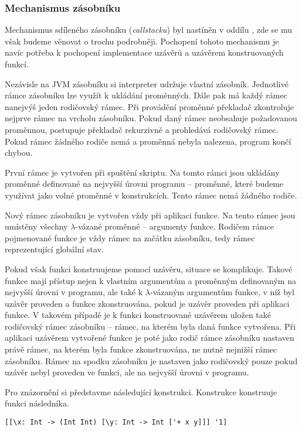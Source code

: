 \subsubsection{Mechanismus zásobníku}

Mechanismus sdíleného zásobníku (\textit{callstacku}) byl nastíněn v oddílu
, zde se mu však budeme věnovat o trochu podrobněji.
Pochopení tohoto mechanismu je navíc potřeba k pochopení implementace uzávěrů a uzávěrem
konstruovaných funkcí.

Nezávisle na JVM zásobníku si interpreter udržuje vlastní zásobník. Jednotlivé rámce zásobníku
lze využít k ukládání proměnných. Dále pak má každý rámec nanejvýš jeden rodičovský rámec.
Při provádění proměnné překladač zkontroluje nejprve rámec na vrcholu zásobníku. Pokud daný rámec
neobsahuje požadovanou proměnnou, postupuje překladač rekurzivně a prohledává rodičovský rámec.
Pokud rámec žádného rodiče nemá a proměnná nebyla nalezena, program končí chybou.

První rámec je vytvořen při spuštění skriptu. Na tomto rámci jsou ukládány proměnné definované
na nejvyšší úrovni programu -- proměnné, které budeme využívat jako volné proměnné v konstrukcích.
Tento rámec nemá žádného rodiče.

Nový rámec zásobníku je vytvořen vždy při aplikaci funkce. Na tento rámec jsou umístěny
všechny $\lambda$-vázané proměnné -- argumenty funkce. Rodičem rámce pojmenované funkce je vždy rámec
na začátku zásobníku, tedy rámec reprezentující globální stav.

Pokud však funkci konstruujeme pomocí uzávěru, situace se komplikuje. Takové funkce mají přístup
nejen k vlastním argumentům a proměnným definovaným na nejvyšší úrovni v programu, ale také
k $\lambda$-vázaným argumentům funkce, v níž byl uzávěr proveden a funkce zkonstruována, pokud je uzávěr
proveden při aplikaci funkce. V takovém případě je k funkci konstruované uzávěrem uložen také
rodičovský rámec zásobníku -- rámec, na kterém byla daná funkce vytvořena. Při aplikaci uzávěrem
vytvořené funkce je poté jako rodič rámce zásobníku nastaven právě rámec, na kterém byla funkce
zkonstruována, ne nutně nejnižší rámec zásobníku. Rámec na spodku zásobníku je nastaven jako
rodičovský pouze pokud uzávěr nebyl proveden ve funkci, ale na nejvyšší úrovni v programu.

Pro znázornění si představme následující konstrukci. Konstrukce konstruuje funkci následníka.

\begin{lstlisting}[caption={Funkce následníka pomocí vnořených uzávěrů}]
[[\x: Int -> (Int Int) [\y: Int -> Int ['+ x y]]] '1]
\end{lstlisting}

